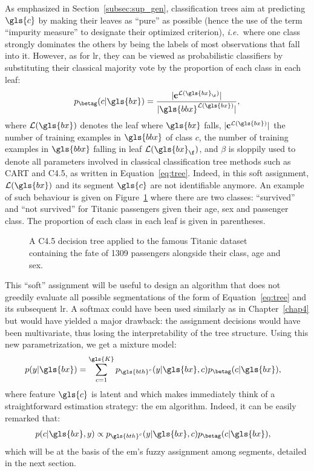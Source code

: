 As emphasized in Section~\ref{subsec:sup_gen}, classification trees aim at predicting $\gls{c}$ by making their leaves as ``pure'' as possible (hence the use of the term ``impurity measure'' to designate their optimized criterion), \textit{i.e.}\ where one class strongly dominates the others by being the labels of most observations that fall into it. However, as for \gls{lr}, they can be viewed as probabilistic classifiers by substituting their classical majority vote by the proportion of each class in each leaf:
\begin{equation} \label{eq:tree_leaf}
p_{\betag}(c | \gls{bx}) = \frac{|\mathbf{c}^{\mathcal{L}(\gls{bx}_\f)}|}{|\gls{bbx}^{\mathcal{L}(\gls{bx})}|},
\end{equation}
where $\mathcal{L}(\gls{bx})$ denotes the leaf where $\gls{bx}$ falls, $|\mathbf{c}^{\mathcal{L}(\gls{bx})}|$ the number of training examples  in $\gls{bbx}$ of class $c$, the number of training examples in $\gls{bbx}$ falling in leaf $\mathcal{L}(\gls{bx}_\f)$, and $\beta$ is sloppily used to denote all parameters involved in classical classification tree methods such as CART and C4.5, as written in Equation~\eqref{eq:tree}. Indeed, in this soft assignment, $\mathcal{L}(\gls{bx})$ and its segment $\gls{c}$ are not identifiable anymore. An example of such behaviour is given on Figure~\ref{fig:titanic_tree} where there are two classes: ``survived'' and ``not survived'' for Titanic passengers given their age, sex and passenger class. The proportion of each class in each leaf is given in parentheses.

\begin{figure}
\centering \resizebox{\textwidth}{!}{}
\caption{A C4.5 decision tree applied to the famous Titanic dataset containing the fate of 1309 passengers alongside their class, age and sex.}
\label{fig:titanic_tree}
\end{figure}

This ``soft'' assignment will be useful to design an algorithm that does not greedily evaluate all possible segmentations of the form of Equation~\eqref{eq:tree} and its subsequent \gls{lr}. A softmax could have been used similarly as in Chapter~\ref{chap4} but would have yielded a major drawback: the assignment decisions would have been multivariate, thus losing the interpretability of the tree structure. Using this new parametrization, we get a mixture model:
\begin{align*}
p(y | \gls{bx}) & = \sum_{c = 1}^{\gls{K}} p_{\gls{bth}^c}(y | \gls{bx}, c) p_{\betag}(c | \gls{bx}),
\end{align*}
where feature $\gls{c}$ is latent and which makes immediately think of a straightforward estimation strategy: the \gls{em} algorithm. Indeed, it can be easily remarked that:
\begin{align*}
p(c | \gls{bx}, y) & \propto p_{\gls{bth}^c}(y | \gls{bx}, c) p_{\betag}(c | \gls{bx}),
\end{align*}
which will be at the basis of the \gls{em}'s fuzzy assignment among segments, detailed in the next section.

